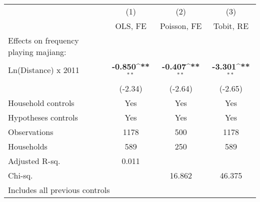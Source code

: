{
\def\sym#1{\ifmmode^{#1}\else\(^{#1}\)\fi}
\begin{tabular}{l*{3}{c}}
\hline\hline
                    &\multicolumn{1}{c}{(1)}&\multicolumn{1}{c}{(2)}&\multicolumn{1}{c}{(3)}\\
                    &\multicolumn{1}{c}{OLS, FE}&\multicolumn{1}{c}{Poisson, FE}&\multicolumn{1}{c}{Tobit, RE}\\
\hline
Effects on frequency playing majiang:&                    &                    &                    \\
Ln(Distance) x 2011 &      \textbf{-0.850\sym{**}}&      \textbf{-0.407\sym{**}}&      \textbf{-3.301\sym{**}}\\
                    &     (-2.34)        &     (-2.64)        &     (-2.65)        \\
Household controls  &         Yes        &         Yes        &         Yes        \\
Hypotheses controls &         Yes        &         Yes        &         Yes        \\
\hline
Observations        &        1178        &         500        &        1178        \\
Households          &         589        &         250        &         589        \\
Adjusted R-sq.      &       0.011        &                    &                    \\
Chi-sq.             &                    &      16.862        &      46.375        \\
\hline\hline
\multicolumn{4}{l}{\footnotesize \tiny{Includes all previous controls}}\\
\end{tabular}
}
